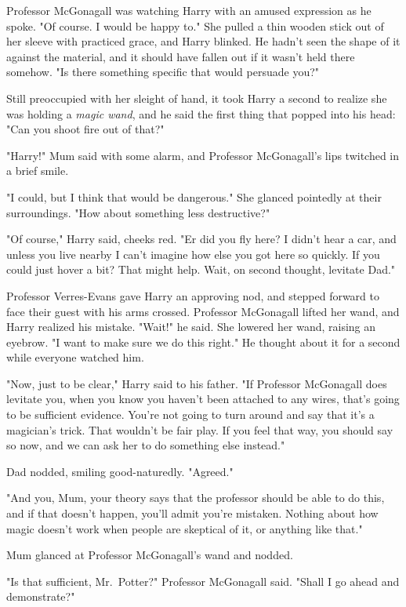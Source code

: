 Professor McGonagall was watching Harry with an amused
expression as he spoke. "Of course. I would be happy to."
She pulled a thin wooden stick out of her sleeve with
practiced grace, and Harry blinked. He hadn't seen the
shape of it against the material, and it should have fallen
out if it wasn't held there somehow. "Is there something
specific that would persuade you?"

Still preoccupied with her sleight of hand, it took Harry a
second to realize she was holding a \emph{magic wand}, and he
said the first thing that popped into his head: "Can you
shoot fire out of that?"

"Harry!" Mum said with some alarm, and Professor
McGonagall's lips twitched in a brief smile.

"I could, but I think that would be dangerous." She
glanced pointedly at their surroundings. "How about
something less destructive?"

"Of course," Harry said, cheeks red. "Er{\el} did you fly
here? I didn't hear a car, and unless you live nearby I
can't imagine how else you got here so quickly. If you
could just{\el} hover a bit? That might help. Wait, on second
thought, levitate Dad."

Professor Verres-Evans gave Harry an approving nod, and
stepped forward to face their guest with his arms crossed.
Professor McGonagall lifted her wand, and Harry realized
his mistake. "Wait!" he said. She lowered her wand, raising
an eyebrow. "I want to make sure we do this right." He
thought about it for a second while everyone watched him.

"Now, just to be clear," Harry said to his father. "If Professor
McGonagall does levitate you, when you know you haven't
been attached to any wires, that's going to be sufficient
evidence. You're not going to turn around and say that it's
a magician's trick. That wouldn't be fair play. If you feel
that way, you should say so now, and we can ask her to
do something else instead."

Dad nodded, smiling good-naturedly. "Agreed."

"And you, Mum, your theory says that the professor
should be able to do this, and if that doesn't happen,
you'll admit you're mistaken. Nothing about how magic
doesn't work when people are skeptical of it, or anything
like that."

Mum glanced at Professor McGonagall's wand and nodded.

"Is that sufficient, Mr.~Potter?" Professor McGonagall said.
"Shall I go ahead and demonstrate?"


